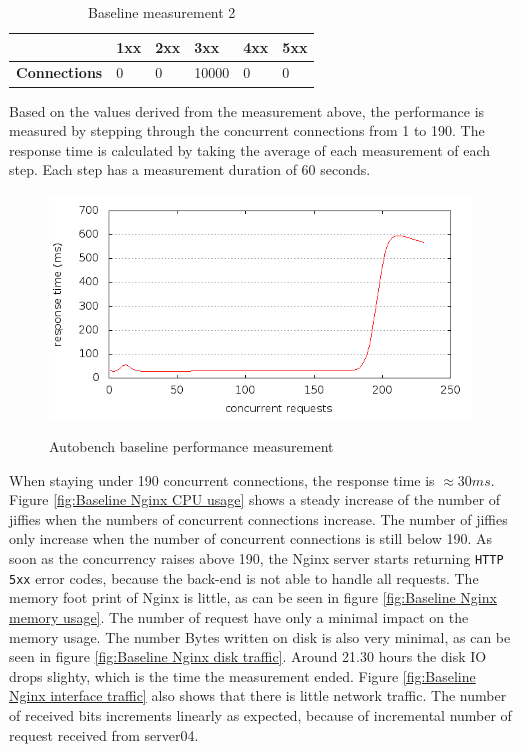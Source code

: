 \documentclass[Measurements]{subfiles}
\begin{document}
\begin{table}[h]
\caption{Baseline measurement 2}
\begin{tabular}{|p{2cm}|p{}|p{}|p{}|p{}|p{}|}
\hline
 & \textbf{1xx} & \textbf{2xx} & \textbf{3xx} & \textbf{4xx} & \textbf{5xx} \\ \hline
\textbf{Connections} & 0 & 0 & 10000 & 0 & 0 \\ \hline
\end{tabular}
\label{fig:Baseline measurement 2}
\end{table}

Based on the values derived from the measurement above, the performance is measured by stepping through the concurrent connections from 1 to 190. The response time is calculated by taking the average of each measurement of  each step. Each step has a measurement duration of 60 seconds. 

\begin{figure}[H]
\caption{Autobench baseline performance measurement}
\centering
\includegraphics[scale=0.55] {images/results/baseline_wp/output.png}
\label{fig:Baseline performance measurement}
\end{figure}

When staying under 190 concurrent connections, the response time is \mbox{$\approx 30 ms$}. Figure \ref{fig:Baseline Nginx CPU usage} shows a steady increase of the number of jiffies when the numbers of concurrent connections increase. The number of jiffies only increase when the number of concurrent connections is still below 190. As soon as the concurrency raises above 190, the Nginx server starts returning \verb+HTTP 5xx+ error codes, because the back-end is not able to handle all requests. The memory foot print of Nginx is little, as can be seen in figure \ref{fig:Baseline Nginx memory usage}. The number of request have only a minimal impact on the memory usage. The number Bytes written on disk is also very minimal, as can be seen in figure \ref{fig:Baseline Nginx disk traffic}. Around 21.30 hours the disk IO drops slighty, which is the time the measurement ended. Figure \ref{fig:Baseline Nginx interface traffic} also shows that there is little network traffic. The number of received bits increments linearly as expected, because of incremental number of request received from server04.   
\end{document}
